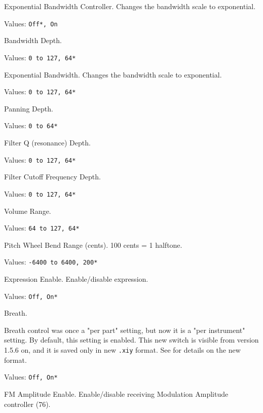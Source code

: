    Exponential Bandwidth Controller.
   Changes the bandwidth scale to exponential.

   Values: \texttt{Off*, On}

   Bandwidth Depth.

   Values: \texttt{0 to 127, 64*}

   Exponential Bandwidth.
   Changes the bandwidth scale to exponential.

   Values: \texttt{0 to 127, 64*}

   Panning Depth.

   Values: \texttt{0 to 64*}

   Filter Q (resonance) Depth.

   Values: \texttt{0 to 127, 64*}

   Filter Cutoff Frequency Depth.

   Values: \texttt{0 to 127, 64*}

   Volume Range.

   Values: \texttt{64 to 127, 64*}

   Pitch Wheel Bend Range (cents).
   100 cents = 1 halftone.

   Values: \texttt{-6400 to 6400, 200*}

   Expression Enable.
   Enable/disable expression.

   Values: \texttt{Off, On*}

   Breath.

   Breath control was once a "per part" setting, but now it is a
   "per instrument" setting.  By default, this setting is enabled.
   This new switch is visible from version 1.5.6 on, and it is saved only in
   new \texttt{.xiy} format.
   See \hspace{4pt}for details on the new format.

   Values: \texttt{Off, On*}

   FM Amplitude Enable.
   Enable/disable receiving Modulation Amplitude controller (76).

